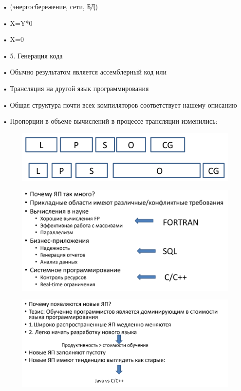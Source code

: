 \documentclass{article}
\begin{document}
• (энергосбережение, сети, БД)

• X=Y*0

• X=0

• 5. Генерация кода

• Обычно результатом является ассемблерный код
или

• Трансляция на другой язык программирования

• Общая структура почти всех компиляторов соответствует нашему
описанию

• Пропорции в объеме вычислений в процессе трансляции
изменились:

\begin{figure}[H]
    \centering
    \includegraphics[width=0.5\linewidth]{Снимок экрана 2025-02-13 085253.png}
\end{figure}

\begin{figure}[H]
    \centering
    \includegraphics[width=1\linewidth]{Снимок экрана 2025-02-13 085330.png}
\end{figure}

\begin{figure}[H]
    \centering
    \includegraphics[width=1\linewidth]{Снимок экрана 2025-02-13 085352.png}
\end{figure}
\end{document}
